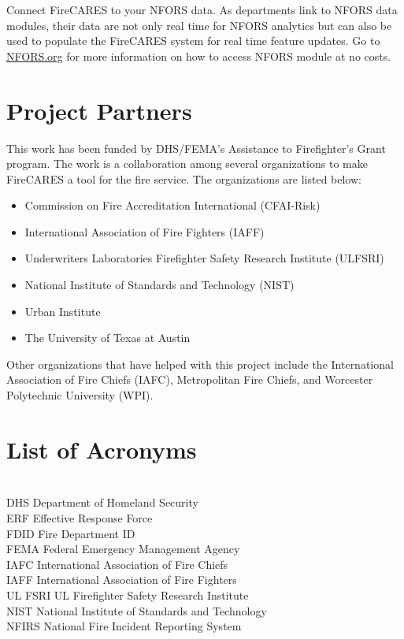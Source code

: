 \documentclass[12pt,oneside]{book}
\begin{document}
Connect FireCARES to your NFORS data. As departments link to NFORS data modules, their data are not only real time for NFORS analytics but can also be used to populate the FireCARES system for real time feature updates. Go to \href{https://nfors.org}{NFORS.org} for more information on how to access NFORS module at no costs.

\chapter{Project Partners}

This work has been funded by DHS/FEMA's Assistance to Firefighter's Grant program. The work is a collaboration among several organizations to make FireCARES a tool for the fire service. The organizations are listed below:

\begin{itemize}
\item Commission on Fire Accreditation International (CFAI-Risk)
\item International Association of Fire Fighters (IAFF)
\item Underwriters Laboratories Firefighter Safety Research Institute (ULFSRI)
\item National Institute of Standards and Technology (NIST)
\item Urban Institute
\item The University of Texas at Austin
\end{itemize}

Other organizations that have helped with this project include the International Association of Fire Chiefs (IAFC), Metropolitan Fire Chiefs, and Worcester Polytechnic University (WPI).

\chapter{List of Acronyms}

\begin{tabbing}
\hspace{1.5in} \= \\

DHS \> Department of Homeland Security \\
ERF \> Effective Response Force \\
FDID \> Fire Department ID \\
FEMA \> Federal Emergency Management Agency \\
IAFC \> International Association of Fire Chiefs \\
IAFF \> International Association of Fire Fighters \\
UL FSRI \> UL Firefighter Safety Research Institute \\
NIST \> National Institute of Standards and Technology  \\
NFIRS \> National Fire Incident Reporting System \\
\end{tabbing}


\end{document}
